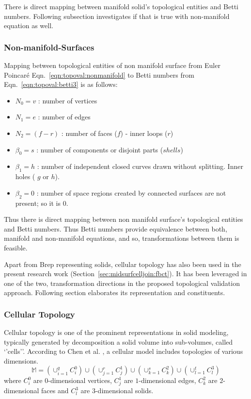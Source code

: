 There is direct mapping between manifold solid's topological entities and Betti numbers. Following subsection investigates if that is true with non-manifold equation as well.

\subsubsection{Non-manifold-Surfaces}


Mapping between topological entities of non manifold surface from Euler Poincar\'e Eqn.~\ref{eqn:topoval:nonmanifold} to Betti numbers from Eqn.~\ref{eqn:topoval:betti3} is as follows:

\begin{itemize}
[noitemsep,topsep=2pt,parsep=2pt,partopsep=2pt,label={}]
\item $N_{0} = v$ : number of vertices
\item $N_{1} = e$ : number of edges
\item $N_{2} = (f - r)$ : number of faces ($f$) -  inner loops ($r$)
\item $\beta_{0} = s$ : number of components or disjoint parts ($shells$)
\item $\beta_{1} = h$ : number of independent closed curves drawn without splitting. Inner holes ( $g$ or $h$). 
\item $\beta_{2} = 0$ : number of space regions created by connected surfaces are not present; so it is $0$.
\end{itemize}

Thus there is direct mapping between non manifold surface's topological entities and Betti numbers. Thus Betti numbers provide equivalence between both, manifold and non-manifold equations, and so, transformations between them is feasible.


Apart from Brep representing solids, cellular topology has also been used in the present research work (Section~\ref{sec:midsurfcelljoin:fbct}). It has been leveraged in one of the two, transformation directions in the proposed topological validation approach. Following section elaborates its representation and constituents.

\subsubsection{Cellular Topology}
Cellular topology is one of the prominent representations in solid modeling, typically generated by decomposition a solid volume into sub-volumes, called `'cells''. According to Chen et al. \cite{Chen2006}, a cellular model includes topologies of various dimensions. 
$$\mathbb{M} = 
(\cup_{i=1}^{q} C_i^0 ) \cup 
(\cup_{j=1}^{r} C_j^1 ) \cup  
(\cup_{k=1}^{s} C_k^2 ) \cup 
(\cup_{l=1}^{t} C_l^3 ) $$ where  $C_i^0$ are $0$-dimensional vertices,  $C_j^1$ are $1$-dimensional edges,  $C_k^2$ are $2$-dimensional faces and  $C_l^3$ are $3$-dimensional solids.


